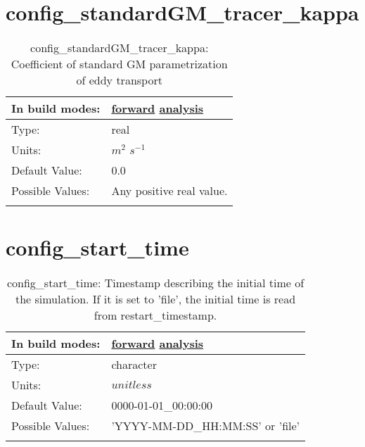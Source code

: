 \section[config\_standardGM\_tracer\_kappa]{config\_standardGM\_tracer\_kappa}
\label{sec:nm_sec_config_standardGM_tracer_kappa}
\begin{center}
\begin{longtable}{| p{2.0in} || p{4.0in} |}
    \hline
    In build modes: & \hyperref[subsec:forward_nm_tab_mesoscale_eddy_parameterization]{forward} \hyperref[subsec:analysis_nm_tab_mesoscale_eddy_parameterization]{analysis} \\
    \hline
    Type: & real \\
    \hline
    Units: & $m^2$ $s^{-1}$ \\
    \hline
    Default Value: & 0.0 \\
    \hline
    Possible Values: & Any positive real value. \\
    \hline
    \caption{config\_standardGM\_tracer\_kappa: Coefficient of standard GM parametrization of eddy transport}
\end{longtable}
\end{center}
\section[config\_start\_time]{config\_start\_time}
\label{sec:nm_sec_config_start_time}
\begin{center}
\begin{longtable}{| p{2.0in} || p{4.0in} |}
    \hline
    In build modes: & \hyperref[subsec:forward_nm_tab_time_management]{forward} \hyperref[subsec:analysis_nm_tab_time_management]{analysis} \\
    \hline
    Type: & character \\
    \hline
    Units: & $unitless$ \\
    \hline
    Default Value: & 0000-01-01\_00:00:00 \\
    \hline
    Possible Values: & 'YYYY-MM-DD\_HH:MM:SS' or 'file' \\
    \hline
    \caption{config\_start\_time: Timestamp describing the initial time of the simulation. If it is set to 'file', the initial time is read from restart\_timestamp.}
\end{longtable}
\end{center}
